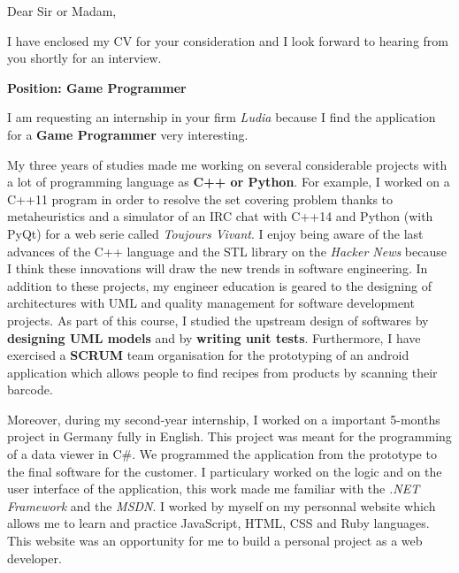 \date{\today}
\opening{Dear Sir or Madam,}
\closing{I have enclosed my CV for your consideration and I look forward to hearing from you shortly for an interview.}

\makelettertitle

\textbf{Position: Game Programmer}

\introduce{}
I am requesting an internship in your firm \textit{Ludia} because I find the application for a \textbf{Game Programmer} very interesting.

My three years of studies made me working on several considerable projects with a lot of programming language as \textbf{C++ or Python}. For example, I worked on a C++11 program in order to resolve the set covering problem thanks to metaheuristics and a simulator of an IRC chat with C++14 and Python (with PyQt) for a web serie called \textit{Toujours Vivant}. I enjoy being aware of the last advances of the C++ language and the STL library on the \textit{Hacker News} because I think these innovations will draw the new trends in software engineering. In addition to these projects, my engineer education is geared to the designing of architectures with UML and quality management for software development projects. As part of this course, I studied the upstream design of softwares by \textbf{designing UML models} and by \textbf{writing unit tests}. Furthermore, I have exercised a \textbf{SCRUM} team organisation for the prototyping of an android application which allows people to find recipes from products by scanning their barcode.

Moreover, during my second-year internship, I worked on a important 5-months project in Germany fully in English. This project was meant for the programming of a data viewer in C\#. We programmed the application from the prototype to the final software for the customer. I particulary worked on the logic and on the user interface of the application, this work made me familiar with the \textit{.NET Framework} and the \textit{MSDN}. I worked by myself on my personnal website which allows me to learn and practice JavaScript, HTML, CSS and Ruby languages. This website was an opportunity for me to build a personal project as a web developer. \conclude{}

\makeletterclosing
